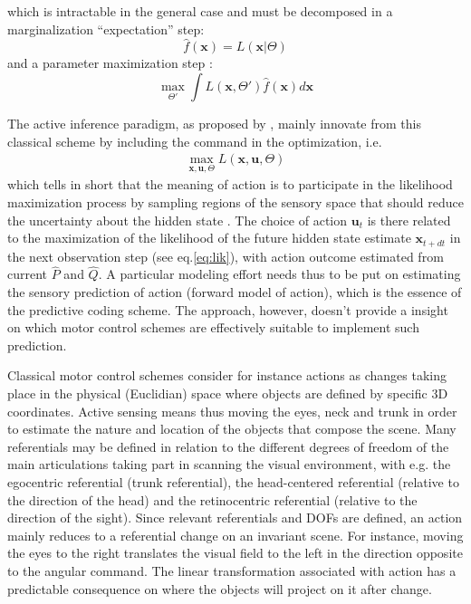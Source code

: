 \documentclass[11pt]{article}
\begin{document}
which is intractable in the general case and must be decomposed in a marginalization ``expectation'' step:
$$\hat{f}(\boldsymbol{x}) = L(\boldsymbol{x}|\Theta)$$
and a parameter maximization step :
$$\max_{\Theta'} \int L(\boldsymbol{x},\Theta')
\hat{f}(\boldsymbol{x}) d\boldsymbol{x} \label{eq:Dempster}$$

The active inference paradigm, as proposed by , mainly innovate from this classical scheme by including the command in the optimization, i.e. 
\begin{align}
\max_{\boldsymbol{x},\boldsymbol{u},\Theta} L(\boldsymbol{x},\boldsymbol{u},\Theta)
\end{align}
which tells in short that the meaning of action is to participate in the likelihood maximization process by sampling regions of the sensory space that should reduce the uncertainty about the hidden state \cite{Buesing2011}. The choice of action $\boldsymbol{u}_t$ is there related to the maximization of the likelihood of the future hidden state estimate $\boldsymbol{x}_{t+dt}$ in the next observation step (see eq.\ref{eq:lik}), with action outcome estimated from current $\hat{P}$ and $\hat{Q}$. A particular modeling effort needs thus to be put on estimating the sensory prediction of action (forward model of action), which is the essence of the predictive coding scheme.  
The approach, however, doesn't provide a insight on which motor control schemes are effectively suitable to implement such prediction.   

Classical motor control schemes consider for instance actions as changes taking place in the physical (Euclidian) space where objects are defined by specific 3D coordinates. Active sensing means thus moving the eyes, neck and trunk in order to estimate the nature and location of the objects that compose the scene.  
Many referentials may be defined in relation to the different degrees of freedom of the main articulations taking part in scanning the visual environment, with e.g. the egocentric referential (trunk referential), the head-centered referential (relative to the direction of the head) and the retinocentric referential (relative to the direction of the sight). Since relevant referentials and DOFs are defined, an action mainly reduces to a referential change on an invariant scene. For instance, moving the eyes to the right translates the visual field to the left in the direction opposite to the angular command. The  linear transformation associated with action has a predictable consequence on where the objects will project on it after change. 
\end{document}
